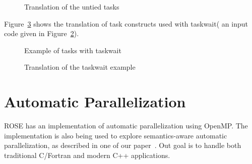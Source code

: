 \begin{figure}[htbp]
{\indent
  {\mySmallFontSize
    \begin{latexonly}
    
    \end{latexonly}
    \begin{htmlonly}
    
    \end{htmlonly}
  }
}
\caption{Translation of the untied tasks}
\label{Manual:omp:task_untied3-trans}
\end{figure}

Figure~\ref{Manual:omp:task_wait-trans} shows the translation of task constructs used with taskwait( an input code given in
Figure~\ref{Manual:omp:task_wait}). 

\lstset{language=C,basicstyle=\scriptsize}
\begin{figure}[htbp]
{\indent
  {\mySmallFontSize
    \begin{latexonly}
    
    \end{latexonly}
    \begin{htmlonly}
    
    \end{htmlonly}
  }
}
\caption{Example of tasks with taskwait}
\label{Manual:omp:task_wait}
\end{figure}

\begin{figure}[htbp]
{\indent
  {\mySmallFontSize
    \begin{latexonly}
    
    \end{latexonly}
    \begin{htmlonly}
    
    \end{htmlonly}
  }
}
\caption{Translation of the taskwait example}
\label{Manual:omp:task_wait-trans}
\end{figure}

\clearpage
\section{Automatic Parallelization}
ROSE has an implementation of automatic parallelization using OpenMP.
The implementation is also being used to explore semantics-aware automatic parallelization, as
described in one of our paper~\cite{LiaoExtending2009}.
Out goal is to handle both traditional C/Fortran and modern C++
applications.

